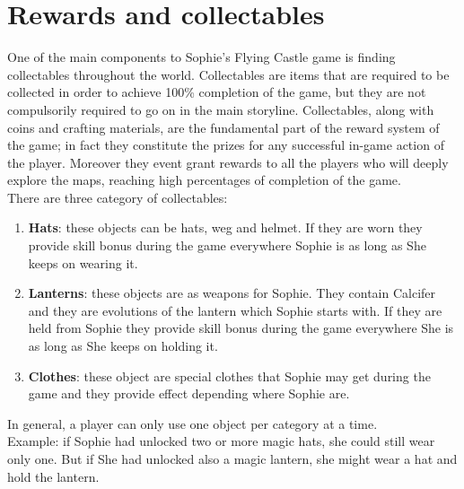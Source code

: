\section{Rewards and collectables}
One of the main components to Sophie's Flying Castle game is finding collectables throughout the world.
Collectables are items that are required to be collected in order to achieve 100\%
completion of the game, but they are not compulsorily required to go on in the main storyline. Collectables, along with coins and crafting materials, are the fundamental part of the reward system of the game; in fact they constitute the prizes for any successful in-game action of the player. Moreover they event grant rewards to all the players who will deeply explore the maps, reaching high percentages of completion of the game.\\

There are three category of collectables:
\begin{enumerate}
\item \textbf{Hats}: these objects can be hats, weg and helmet. If they are worn they provide skill bonus during the game everywhere Sophie is as long as She keeps on wearing it.\\
\item \textbf{Lanterns}: these objects are as weapons for Sophie. They contain Calcifer and they are evolutions of the lantern which Sophie starts with. If they are held from Sophie they provide skill bonus during the game everywhere She is as long as She keeps on holding it.
\item \textbf{Clothes}: these object are special clothes that Sophie may get during the game and they provide effect depending where Sophie are.  
  \end{enumerate}
In general, a player can only use one object per category at a time. \\
Example: if Sophie had unlocked two or more magic hats, she could still wear only one. But if She had unlocked also a magic lantern, she might wear a hat and hold the lantern.

